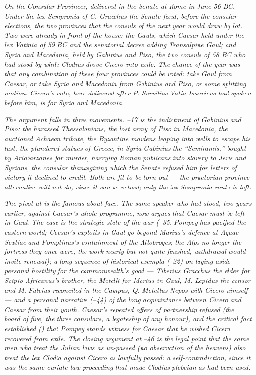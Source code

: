 
\textit{On the Consular Provinces, delivered in the Senate at
Rome in June 56 BC. Under the lex Sempronia of C. Gracchus
the Senate fixed, before the consular elections, the two
provinces that the consuls of the next year would draw by
lot. Two were already in front of the house: the Gauls,
which Caesar held under the lex Vatinia of 59 BC and the
senatorial decree adding Transalpine Gaul; and Syria and
Macedonia, held by Gabinius and Piso, the two consuls of
58 BC who had stood by while Clodius drove Cicero into
exile. The chance of the year was that any combination of
these four provinces could be voted: take Gaul from Caesar,
or take Syria and Macedonia from Gabinius and Piso, or
some splitting motion. Cicero's vote, here delivered after
P. Servilius Vatia Isauricus had spoken before him, is for
Syria and Macedonia.}

\textit{The argument falls in three movements. --17 is the indictment of Gabinius and Piso: the harassed
Thessalonians, the lost army of Piso in Macedonia, the
auctioned Achaean tribute, the Byzantine maidens leaping
into wells to escape his lust, the plundered statues of
Greece; in Syria Gabinius the ``Semiramis,'' bought by
Ariobarzanes for murder, harrying Roman publicans into
slavery to Jews and Syrians, the consular thanksgiving
which the Senate refused him for letters of victory it
declined to credit. Both are fit to be torn out --- the
praetorian-province alternative will not do, since it can
be vetoed; only the lex Sempronia route is left.}

\textit{The pivot at  is the famous
about-face. The same speaker who had stood, two years
earlier, against Caesar's whole programme, now argues that
Caesar must be left in Gaul. The case is the strategic
state of the war (--35: Pompey has
pacified the eastern world; Caesar's exploits in Gaul go
beyond Marius's defence at Aquae Sextiae and Pomptinus's
containment of the Allobroges; the Alps no longer the
fortress they once were, the work nearly but not quite
finished, withdrawal would invite renewal); a long
sequence of historical exempla (--22) on
laying aside personal hostility for the commonwealth's
good --- Tiberius Gracchus the elder for Scipio Africanus's
brother, the Metelli for Marius in Gaul, M. Lepidus the
censor and M. Fulvius reconciled in the Campus, Q. Metellus
Nepos with Cicero himself --- and a personal narrative
(--44) of the long acquaintance between
Cicero and Caesar from their youth, Caesar's repeated
offers of partnership refused (the board of five, the
three consulars, a legateship of any honour), and the
critical fact established () that Pompey
stands witness for Caesar that he wished Cicero recovered
from exile. The closing argument at --46
is the legal point that the same men who treat the Julian
laws as un-passed (no observation of the heavens) also
treat the lex Clodia against Cicero as lawfully passed: a
self-contradiction, since it was the same curiate-law
proceeding that made Clodius plebeian as had been used.}

